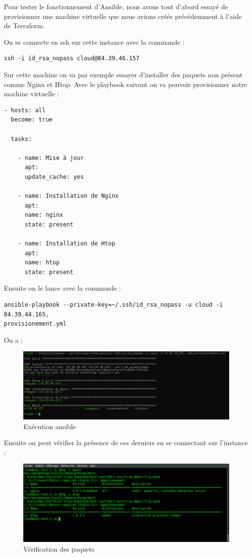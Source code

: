 \documentclass[]{article}
\begin{document}
Pour tester le fonctionnement d'Ansible, nous avons tout d'abord essayé
de provisionner une machine virtuelle que nous avions créée précédemment
à l'aide de Terraform. 


On se connecte en ssh sur cette instance avec la commande :

\begin{verbatim}
ssh -i id_rsa_nopass cloud@84.39.46.157
\end{verbatim}

Sur cette machine on va par exemple essayer d'installer des paquets non
présent comme Nginx et Htop. Avec le playbook suivant on va pouvoir
provisionner notre machine virtuelle :

\begin{verbatim}
- hosts: all
  become: true

  tasks:

    - name: Mise à jour 
      apt:
      update_cache: yes

    - name: Installation de Nginx
      apt:
      name: nginx
      state: present

    - name: Installation de Htop
      apt:
      name: htop
      state: present
\end{verbatim}

Ensuite on le lance avec la commande :

\begin{verbatim}
ansible-playbook --private-key=~/.ssh/id_rsa_nopass -u cloud -i 84.39.44.165, 
provisionement.yml
\end{verbatim}

On a :

\begin{figure}
\centering
\includegraphics{Images/application.png}
\caption{Exécution ansible}
\end{figure}

Ensuite on peut vérifier la présence de ces derniers en se connectant
sur l'instance :

\begin{figure}
\centering
\includegraphics{Images/verification.png}
\caption{Vérification des paquets}
\end{figure}
\end{document}
